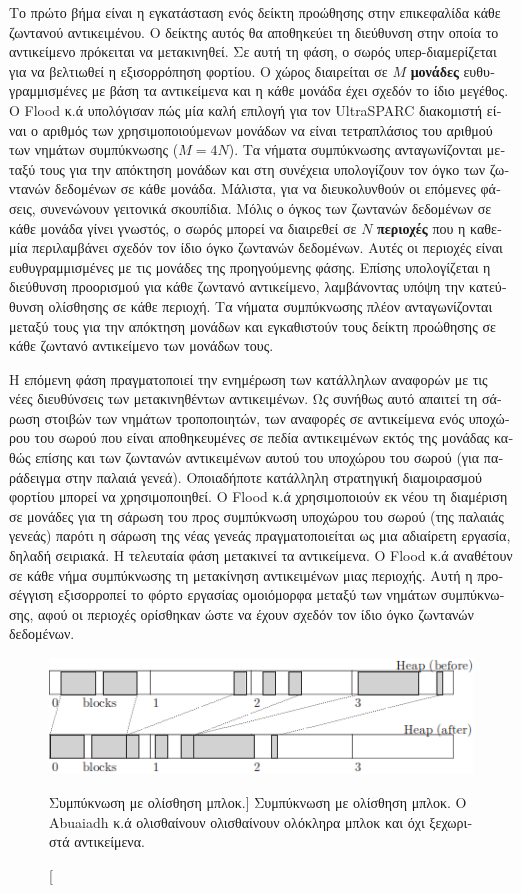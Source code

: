 \begin{greek}
Το πρώτο βήμα είναι η εγκατάσταση ενός δείκτη προώθησης στην
επικεφαλίδα κάθε ζωντανού αντικειμένου. Ο δείκτης αυτός θα
αποθηκεύει τη διεύθυνση στην οποία το αντικείμενο πρόκειται
να μετακινηθεί. Σε αυτή τη φάση, ο σωρός υπερ-διαμερίζεται
για να βελτιωθεί η εξισορρόπηση φορτίου. Ο χώρος διαιρείται
σε $M$ \textbf{μονάδες} ευθυγραμμισμένες με βάση τα αντικείμενα
και η κάθε μονάδα έχει σχεδόν το ίδιο μεγέθος. Ο Flood κ.ά υπολόγισαν
πώς μία καλή επιλογή για τον UltraSPARC διακομιστή είναι ο
αριθμός των χρησιμοποιούμενων μονάδων να είναι τετραπλάσιος
του αριθμού των νημάτων συμπύκνωσης ($M=4N$). Τα νήματα συμπύκνωσης
ανταγωνίζονται μεταξύ τους για την απόκτηση μονάδων και στη
συνέχεια υπολογίζουν τον όγκο των ζωντανών δεδομένων σε κάθε
μονάδα. Μάλιστα, για να διευκολυνθούν οι επόμενες φάσεις,
συνενώνουν γειτονικά σκουπίδια. Μόλις ο όγκος των ζωντανών
δεδομένων σε κάθε μονάδα γίνει γνωστός, ο σωρός μπορεί να 
διαιρεθεί σε $N$ \textbf{περιοχές} που η καθεμία περιλαμβάνει
σχεδόν τον ίδιο όγκο ζωντανών δεδομένων. Αυτές οι περιοχές
είναι ευθυγραμμισμένες με τις μονάδες της προηγούμενης φάσης.
Επίσης υπολογίζεται η διεύθυνση προορισμού για κάθε ζωντανό
αντικείμενο, λαμβάνοντας υπόψη την κατεύθυνση ολίσθησης σε
κάθε περιοχή. Τα νήματα συμπύκνωσης πλέον ανταγωνίζονται μεταξύ
τους για την απόκτηση μονάδων και εγκαθιστούν τους δείκτη προώθησης
σε κάθε ζωντανό αντικείμενο των μονάδων τους.

Η επόμενη φάση πραγματοποιεί την ενημέρωση των κατάλληλων αναφορών
με τις νέες διευθύνσεις των μετακινηθέντων αντικειμένων. Ως
συνήθως αυτό απαιτεί τη σάρωση στοιβών των νημάτων τροποποιητών,
των αναφορές σε αντικείμενα ενός υποχώρου του σωρού που είναι
αποθηκευμένες σε πεδία αντικειμένων εκτός της μονάδας καθώς
επίσης και των ζωντανών αντικειμένων αυτού του υποχώρου του
σωρού (για παράδειγμα στην παλαιά γενεά). Οποιαδήποτε κατάλληλη
στρατηγική διαμοιρασμού φορτίου μπορεί να χρησιμοποιηθεί. Ο
Flood κ.ά χρησιμοποιούν εκ νέου τη διαμέριση σε μονάδες για
τη σάρωση του προς συμπύκνωση υποχώρου του σωρού (της παλαιάς
γενεάς) παρότι η σάρωση της νέας γενεάς πραγματοποιείται ως
μια αδιαίρετη εργασία, δηλαδή σειριακά. Η τελευταία φάση μετακινεί
τα αντικείμενα. Ο Flood κ.ά αναθέτουν σε κάθε νήμα συμπύκνωσης
τη μετακίνηση αντικειμένων μιας περιοχής. Αυτή η προσέγγιση
εξισορροπεί το φόρτο εργασίας ομοιόμορφα μεταξύ των νημάτων
συμπύκνωσης, αφού οι περιοχές ορίσθηκαν ώστε να έχουν σχεδόν
τον ίδιο όγκο ζωντανών δεδομένων.

\begin{figure}[H]
  \centering
  \includegraphics{figures/par_6}
  \caption
    [Συμπύκνωση με ολίσθηση μπλοκ.]
    {Συμπύκνωση με ολίσθηση μπλοκ. Ο Abuaiadh κ.ά ολισθαίνουν
     ολισθαίνουν ολόκληρα μπλοκ και όχι ξεχωριστά αντικείμενα.}
  \label{fig:par_6}
\end{figure}


\end{greek}

